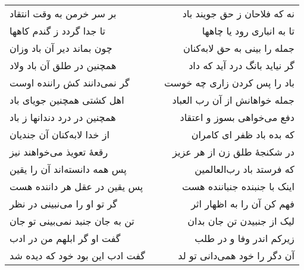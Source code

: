 \begin{center}
\begin{longtable}{l p{0.5cm} r}
بر سر خرمن به وقت انتقاد
&&
نه که فلاحان ز حق جویند باد
\\
تا جدا گردد ز گندم کاهها
&&
تا به انباری رود یا چاهها
\\
چون بماند دیر آن باد وزان
&&
جمله را بینی به حق لابه‌کنان
\\
همچنین در طلق آن باد ولاد
&&
گر نیاید بانگ درد آید که داد
\\
گر نمی‌دانند کش راننده اوست
&&
باد را پس کردن زاری چه خوست
\\
اهل کشتی همچنین جویای باد
&&
جمله خواهانش از آن رب العباد
\\
همچنین در درد دندانها ز باد
&&
دفع می‌خواهی بسوز و اعتقاد
\\
از خدا لابه‌کنان آن جندیان
&&
که بده باد ظفر ای کامران
\\
رقعهٔ تعویذ می‌خواهند نیز
&&
در شکنجهٔ طلق زن از هر عزیز
\\
پس همه دانسته‌اند آن را یقین
&&
که فرستد باد رب‌العالمین
\\
پس یقین در عقل هر داننده هست
&&
اینک با جنبنده جنباننده هست
\\
گر تو او را می‌نبینی در نظر
&&
فهم کن آن را به اظهار اثر
\\
تن به جان جنبد نمی‌بینی تو جان
&&
لیک از جنبیدن تن جان بدان
\\
گفت او گر ابلهم من در ادب
&&
زیرکم اندر وفا و در طلب
\\
گفت ادب این بود خود که دیده شد
&&
آن دگر را خود همی‌دانی تو لد
\\
\end{longtable}
\end{center}
